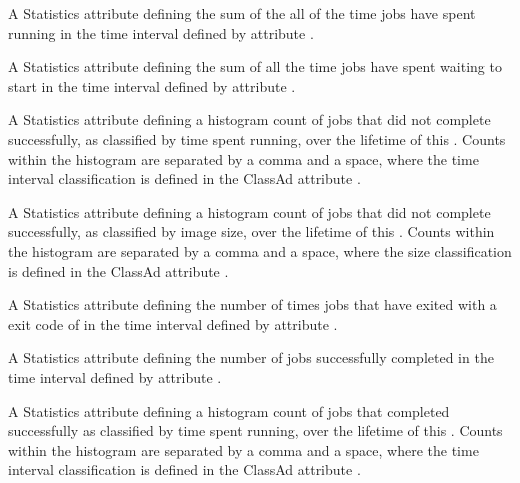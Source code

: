 \begin{description}
\item[\AdAttr{JobsAccumRunningTime}:]  A Statistics attribute defining
  the sum of the all of the time jobs have spent running
  in the time interval defined by attribute .

\item[\AdAttr{JobsAccumTimeToStart}:] A Statistics attribute defining
  the sum of all the time jobs have spent waiting to start
  in the time interval defined by attribute .

\item[\AdAttr{JobsBadputRuntimes}:] A Statistics attribute defining
  a histogram count of jobs that did not complete successfully, 
  as classified by time spent running,
  over the lifetime of this .
  Counts within the histogram are separated by a comma and a space, 
  where the time interval classification is defined in the ClassAd attribute
  .

\item[\AdAttr{JobsBadputSizes}:] A Statistics attribute defining
  a histogram count of jobs that did not complete successfully,
  as classified by image size,
  over the lifetime of this .
  Counts within the histogram are separated by a comma and a space, 
  where the size classification is defined in the ClassAd attribute
  .

\item[\AdAttr{JobsCheckpointed}:] A Statistics attribute defining
  the number of times jobs that have exited 
  with a  exit code of 
  in the time interval defined by attribute .

\item[\AdAttr{JobsCompleted}:] A Statistics attribute defining
  the number of jobs successfully completed
  in the time interval defined by attribute .

\item[\AdAttr{JobsCompletedRuntimes}:] A Statistics attribute defining
  a histogram count of jobs that completed successfully 
  as classified by time spent running,
  over the lifetime of this .
  Counts within the histogram are separated by a comma and a space, 
  where the time interval classification is defined in the ClassAd attribute
  .


\end{description}
